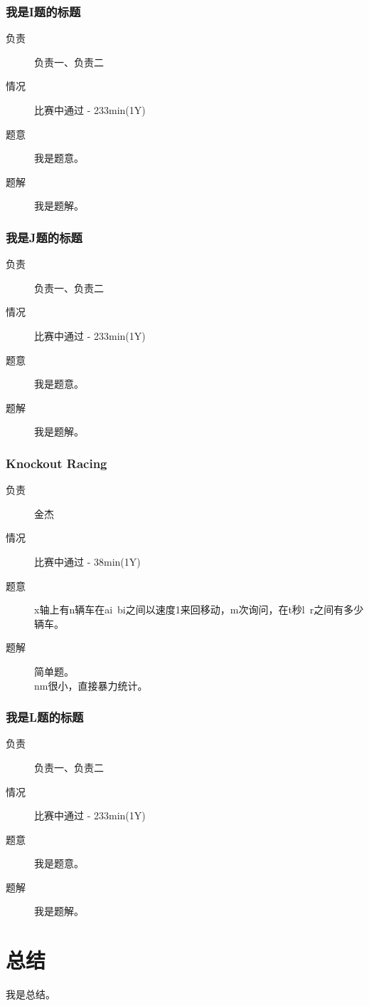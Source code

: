 \documentclass[a4paper, 11pt, nofonts, nocap, fancyhdr]{ctexart}
\newcommand{\problem}[1]{\subsubsection{#1}}
\begin{document}
\problem{我是I题的标题}

\begin{description}
\item[负责] 负责一、负责二
\item[情况] 比赛中通过 - 233min(1Y)
\item[题意]
我是题意。
\item[题解]
我是题解。
\end{description}

\problem{我是J题的标题}

\begin{description}
\item[负责] 负责一、负责二
\item[情况] 比赛中通过 - 233min(1Y)
\item[题意]
我是题意。
\item[题解]
我是题解。
\end{description}

\problem{Knockout Racing}

\begin{description}
\item[负责] 金杰
\item[情况] 比赛中通过 - 38min(1Y)
\item[题意]
x轴上有n辆车在ai~bi之间以速度1来回移动，m次询问，在t秒l~r之间有多少辆车。
\item[题解]
简单题。\\
nm很小，直接暴力统计。
\end{description}

\problem{我是L题的标题}

\begin{description}
\item[负责] 负责一、负责二
\item[情况] 比赛中通过 - 233min(1Y)
\item[题意]
我是题意。
\item[题解]
我是题解。
\end{description}

\section{总结}

我是总结。
\end{document}
